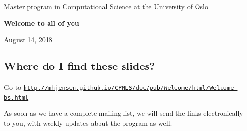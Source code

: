 \documentclass[%
oneside,                 %
final,                   %
10pt]{article}
\begin{document}

\newcommand{\exercisesection}[1]{\subsection*{#1}}






\thispagestyle{empty}

\begin{center}
{\LARGE\bf
\begin{spacing}{1.25}
Master program in Computational Science  at the University of Oslo
\end{spacing}
}
\end{center}


\begin{center}
{\bf Welcome to all of you${}^{}$} \\ [0mm]
\end{center}

\begin{center}
\end{center}
    


\begin{center}
August 14, 2018
\end{center}

\vspace{1cm}


\subsection{Where do I find these slides?}


\paragraph{}
Go to \href{{http://mhjensen.github.io/CPMLS/doc/pub/Welcome/html/Welcome-bs.html}}{\nolinkurl{http://mhjensen.github.io/CPMLS/doc/pub/Welcome/html/Welcome-bs.html}}

As soon as we have a complete mailing list, we will send the links electronically to you, with weekly updates about the program as well.
\end{document}
